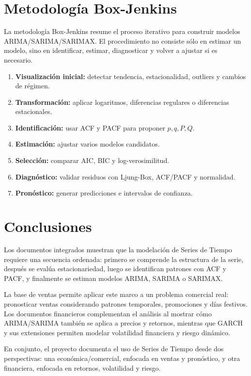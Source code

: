 \documentclass[12pt,a4paper]{article}
\begin{document}
\section{Metodología Box-Jenkins}

\begin{markdowncell}
La metodología Box-Jenkins resume el proceso iterativo para construir modelos ARIMA/SARIMA/SARIMAX. El procedimiento no consiste sólo en estimar un modelo, sino en identificar, estimar, diagnosticar y volver a ajustar si es necesario.
\end{markdowncell}

\begin{enumerate}
    \item \textbf{Visualización inicial:} detectar tendencia, estacionalidad, outliers y cambios de régimen.
    \item \textbf{Transformación:} aplicar logaritmos, diferencias regulares o diferencias estacionales.
    \item \textbf{Identificación:} usar ACF y PACF para proponer \(p,q,P,Q\).
    \item \textbf{Estimación:} ajustar varios modelos candidatos.
    \item \textbf{Selección:} comparar AIC, BIC y log-verosimilitud.
    \item \textbf{Diagnóstico:} validar residuos con Ljung-Box, ACF/PACF y normalidad.
    \item \textbf{Pronóstico:} generar predicciones e intervalos de confianza.
\end{enumerate}

\section{Conclusiones}

\begin{interpretacion}
Los documentos integrados muestran que la modelación de Series de Tiempo requiere una secuencia ordenada: primero se comprende la estructura de la serie, después se evalúa estacionariedad, luego se identifican patrones con ACF y PACF, y finalmente se estiman modelos ARIMA, SARIMA o SARIMAX.

La base de ventas permite aplicar este marco a un problema comercial real: pronosticar ventas considerando patrones temporales, promociones y días festivos. Los documentos financieros complementan el análisis al mostrar cómo ARIMA/SARIMA también se aplica a precios y retornos, mientras que GARCH y sus extensiones permiten modelar volatilidad financiera y riesgo dinámico.

En conjunto, el proyecto documenta el uso de Series de Tiempo desde dos perspectivas: una económica/comercial, enfocada en ventas y pronóstico, y otra financiera, enfocada en retornos, volatilidad y riesgo.
\end{interpretacion}
\end{document}
